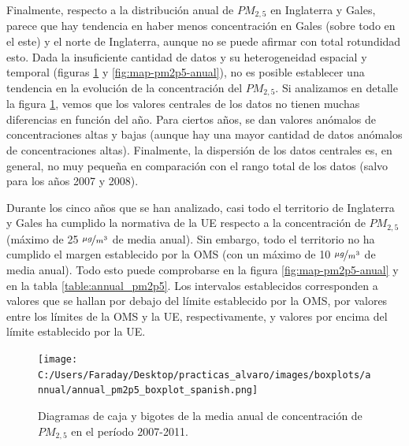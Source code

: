 \documentclass[12pt]{article}
\begin{document}
Finalmente, respecto a la distribución anual de $PM_{2,5}$ en Inglaterra y Gales, parece que hay tendencia en haber menos concentración en Gales (sobre todo en el este) y el norte de Inglaterra, aunque no se puede afirmar con total rotundidad esto. Dada la insuficiente cantidad de datos y su heterogeneidad espacial y temporal (figuras \ref{fig:box_pm2p5_annual} y \ref{fig:map-pm2p5-anual}), no es posible establecer una tendencia en la evolución de la concentración del $PM_{2,5}$. Si analizamos en detalle la figura \ref{fig:box_pm2p5_annual}, vemos que los valores centrales de los datos no tienen muchas diferencias en función del año. Para ciertos años, se dan valores anómalos de concentraciones altas y bajas (aunque hay una mayor cantidad de datos anómalos de concentraciones altas). Finalmente, la dispersión de los datos centrales es, en general, no muy pequeña en comparación con el rango total de los datos (salvo para los años 2007 y 2008).

Durante los cinco años que se han analizado, casi todo el territorio de Inglaterra y Gales ha cumplido la normativa de la UE respecto a la concentración de $PM_{2,5}$ (máximo de 25 $\nicefrac{\mu g}{m^3}$ de media anual). Sin embargo, todo el territorio no ha cumplido el margen establecido por la OMS (con un máximo de 10 $\nicefrac{\mu g}{m^3}$ de media anual). Todo esto puede comprobarse en la figura \ref{fig:map-pm2p5-anual} y en la tabla \ref{table:annual_pm2p5}. Los intervalos establecidos corresponden a valores que se hallan por debajo del límite establecido por la OMS, por valores entre los límites de la OMS y la UE, respectivamente, y valores por encima del límite establecido por la UE.

\begin{figure}[H]
\centering
\texttt{[image: C:/Users/Faraday/Desktop/practicas\_alvaro/images/boxplots/annual/annual\_pm2p5\_boxplot\_spanish.png]}
\caption{Diagramas de caja y bigotes de la media anual de concentración de $PM_{2,5}$ en el período 2007-2011.}
\label{fig:box_pm2p5_annual}
\end{figure}
\end{document}
